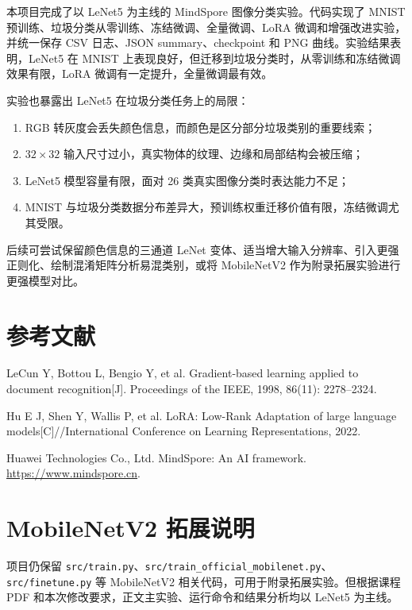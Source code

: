\documentclass[UTF8,a4paper,zihao=-4]{ctexbook}
\begin{document}
本项目完成了以 LeNet5 为主线的 MindSpore 图像分类实验。代码实现了 MNIST 预训练、垃圾分类从零训练、冻结微调、全量微调、LoRA 微调和增强改进实验，并统一保存 CSV 日志、JSON summary、checkpoint 和 PNG 曲线。实验结果表明，LeNet5 在 MNIST 上表现良好，但迁移到垃圾分类时，从零训练和冻结微调效果有限，LoRA 微调有一定提升，全量微调最有效。

实验也暴露出 LeNet5 在垃圾分类任务上的局限：

\begin{enumerate}[label=(\arabic*)]
    \item RGB 转灰度会丢失颜色信息，而颜色是区分部分垃圾类别的重要线索；
    \item $32 \times 32$ 输入尺寸过小，真实物体的纹理、边缘和局部结构会被压缩；
    \item LeNet5 模型容量有限，面对 26 类真实图像分类时表达能力不足；
    \item MNIST 与垃圾分类数据分布差异大，预训练权重迁移价值有限，冻结微调尤其受限。
\end{enumerate}

后续可尝试保留颜色信息的三通道 LeNet 变体、适当增大输入分辨率、引入更强正则化、绘制混淆矩阵分析易混类别，或将 MobileNetV2 作为附录拓展实验进行更强模型对比。

\backmatter

\chapter*{参考文献}

\begin{description}[itemsep=4pt]
\item[{[1]}] LeCun Y, Bottou L, Bengio Y, et al. Gradient-based learning applied to document recognition[J]. Proceedings of the IEEE, 1998, 86(11): 2278--2324.
\item[{[2]}] Hu E J, Shen Y, Wallis P, et al. LoRA: Low-Rank Adaptation of large language models[C]//International Conference on Learning Representations, 2022.
\item[{[3]}] Huawei Technologies Co., Ltd. MindSpore: An AI framework. \url{https://www.mindspore.cn}.
\end{description}

\appendix

\chapter{MobileNetV2 拓展说明}

项目仍保留 \texttt{src/train.py}、\texttt{src/train\_official\_mobilenet.py}、\texttt{src/finetune.py} 等 MobileNetV2 相关代码，可用于附录拓展实验。但根据课程 PDF 和本次修改要求，正文主实验、运行命令和结果分析均以 LeNet5 为主线。
\end{document}
